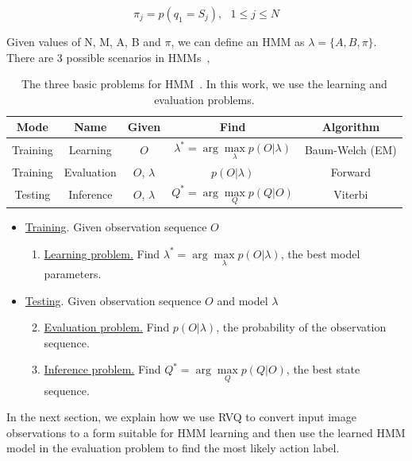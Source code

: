 \begin{equation}
\pi_j = p(q_1=S_j), \ \ \ 1\leq j \leq N
\end{equation}

Given values of N, M, A, B and $\pi$, we can define an HMM as $\lambda=\{A, B, \pi\}$.  There are 3 possible scenarios in HMMs~\cite{1989_JNL_TutorialHMM_Rabiner},


\begin{table}[t]
\centering
\begin{tabular}{|c|c|c|c|c|}\hline
\textbf{Mode} & \textbf{Name} & \textbf{Given}& \textbf{Find}& \textbf{Algorithm}\\\hline\hline
Training & Learning & $O$ & $\lambda^* = \arg\max\limits_\lambda p(O|\lambda)$ &Baum-Welch (EM)\\\hline
Training & Evaluation & $O$, $\lambda$ & $p(O|\lambda)$&Forward\\\hline
Testing & Inference & $O$, $\lambda$ & $Q^* = \arg\max\limits_Q p(Q|O)$&Viterbi\\\hline
\end{tabular}
\caption{The three basic problems for HMM~\cite{1989_JNL_TutorialHMM_Rabiner}.  In this work, we use the learning and evaluation problems.}
\end{table}


\begin{itemize}
\item \underline{Training}.  Given observation sequence $O$
\begin{enumerate}
\item \underline{Learning problem.}  Find $\lambda^* = \arg\max\limits_\lambda p(O|\lambda)$, the best model parameters.
\end{enumerate}
\item \underline{Testing}.  Given observation sequence $O$ and model $\lambda$
\begin{enumerate}\setcounter{enumi}{1}
\item \underline{Evaluation problem.}  Find $p(O|\lambda)$, the probability of the observation sequence.
\item \underline{Inference problem.}  Find $Q^* = \arg\max\limits_Q p(Q|O)$, the best state sequence.
\end{enumerate}
\end{itemize}

In the next section, we explain how we use RVQ to convert input image observations to a form suitable for HMM learning and then use the learned HMM model in the evaluation problem to find the most likely action label.


